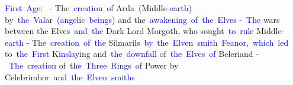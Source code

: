 \documentclass{article}
\begin{document}
\begin{tcolorbox}[colframe=black,colback=white]
\textcolor{blue}{First}\textcolor{blue}{~Age}:\textcolor{blue}{~
}\textcolor{blue}{-} The\textcolor{blue}{~creation}\textcolor{blue}{~of} Arda\textcolor{blue}{~(}Middle\textcolor{blue}{-earth}\textcolor{blue}{)} by\textcolor{blue}{~the}\textcolor{blue}{~Val}ar\textcolor{blue}{~(}\textcolor{blue}{angel}ic\textcolor{blue}{~beings}\textcolor{blue}{)} and the\textcolor{blue}{~awakening}\textcolor{blue}{~of}\textcolor{blue}{~the}\textcolor{blue}{~Elves}\textcolor{blue}{
}\textcolor{blue}{-}\textcolor{blue}{~The} wars between the Elves\textcolor{blue}{~and}\textcolor{blue}{~the} Dark Lord Morgoth, who sought\textcolor{blue}{~to}\textcolor{blue}{~rule} Middle\textcolor{blue}{-earth}\textcolor{blue}{
}\textcolor{blue}{-} The\textcolor{blue}{~creation}\textcolor{blue}{~of}\textcolor{blue}{~the} Silmarils\textcolor{blue}{~by}\textcolor{blue}{~the}\textcolor{blue}{~El}\textcolor{blue}{ven}\textcolor{blue}{~smith}\textcolor{blue}{~Fe}\textcolor{blue}{an}\textcolor{blue}{or},\textcolor{blue}{~which}\textcolor{blue}{~led} to\textcolor{blue}{~the}\textcolor{blue}{~First} K\textcolor{blue}{ins}\textcolor{blue}{lay}ing and\textcolor{blue}{~the}\textcolor{blue}{~downfall} of\textcolor{blue}{~the}\textcolor{blue}{~Elves}\textcolor{blue}{~of} Beleriand\textcolor{blue}{
}\textcolor{blue}{-}\textcolor{blue}{~The}\textcolor{blue}{~creation} of\textcolor{blue}{~the}\textcolor{blue}{~Three}\textcolor{blue}{~Rings}\textcolor{blue}{~of} Power by Celebr\textcolor{blue}{im}bor\textcolor{blue}{~and}\textcolor{blue}{~the}\textcolor{blue}{~El}\textcolor{blue}{ven}\textcolor{blue}{~smith}\textcolor{blue}{s}\textcolor{blue}{

}
\end{tcolorbox}
\end{document}
